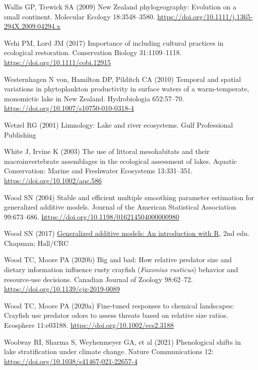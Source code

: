\documentclass[
  12pt,
  a4paper,
  oneside]{scrbook}
\newlength{\cslhangindent}
\newenvironment{CSLReferences}[2] %
 {\begin{list}{}{%
  \setlength{\itemindent}{0pt}
  \setlength{\leftmargin}{0pt}
  \setlength{\parsep}{0pt}
  \ifodd #1
   \setlength{\leftmargin}{\cslhangindent}
   \setlength{\itemindent}{-1\cslhangindent}
  \fi
  \setlength{\itemsep}{#2\baselineskip}}}
 {\end{list}}
\begin{document}
\begin{CSLReferences}{1}{1}
Wallis GP, Trewick SA (2009) {New Zealand} phylogeography: Evolution on
a small continent. Molecular Ecology 18:3548--3580.
\url{https://doi.org/10.1111/j.1365-294X.2009.04294.x}

Wehi PM, Lord JM (2017) Importance of including cultural practices in
ecological restoration. Conservation Biology 31:1109--1118.
\url{https://doi.org/10.1111/cobi.12915}

Westernhagen N von, Hamilton DP, Pilditch CA (2010) Temporal and spatial
variations in phytoplankton productivity in surface waters of a
warm-temperate, monomictic lake in {New Zealand}. Hydrobiologia
652:57--70. \url{https://doi.org/10.1007/s10750-010-0318-4}

Wetzel RG (2001) Limnology: Lake and river ecosystems. Gulf Professional
Publishing

White J, Irvine K (2003) The use of littoral mesohabitats and their
macroinvertebrate assemblages in the ecological assessment of lakes.
Aquatic Conservation: Marine and Freshwater Ecosystems 13:331--351.
\url{https://doi.org/10.1002/aqc.586}

Wood SN (2004) Stable and efficient multiple smoothing parameter
estimation for generalized additive models. Journal of the American
Statistical Association 99:673--686.
\url{https://doi.org/10.1198/016214504000000980}

Wood SN (2017) \href{https://doi.org/10.1201/9781315370279}{Generalized
additive models: An introduction with {R}}, 2nd edn. Chapman; Hall/CRC

Wood TC, Moore PA (2020b) Big and bad: How relative predator size and
dietary information influence rusty crayfish ({\emph{Faxonius
rusticus}}) behavior and resource-use decisions. Canadian Journal of
Zoology 98:62--72. \url{https://doi.org/10.1139/cjz-2019-0089}

Wood TC, Moore PA (2020a) Fine-tuned responses to chemical landscapes:
Crayfish use predator odors to assess threats based on relative size
ratios. Ecosphere 11:e03188. \url{https://doi.org/10.1002/ecs2.3188}

Woolway RI, Sharma S, Weyhenmeyer GA, et al (2021) Phenological shifts
in lake stratification under climate change. Nature Communications 12:
\url{https://doi.org/10.1038/s41467-021-22657-4}


\end{CSLReferences}
\end{document}

